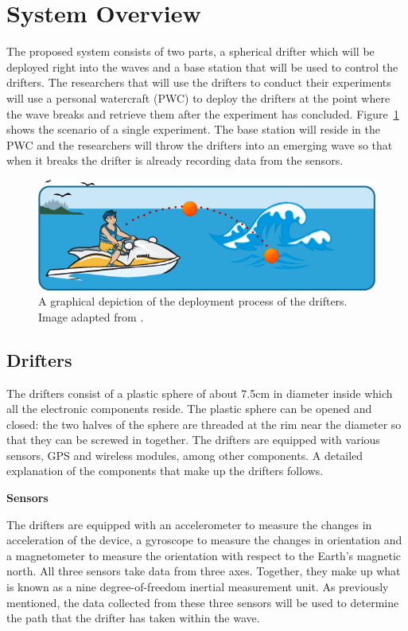\section{System Overview}
The proposed system consists of two parts, a spherical drifter which will be deployed right into the waves and a base station that will be used to control the drifters.  The researchers that will use the drifters to conduct their experiments will use a personal watercraft (PWC) to deploy the drifters at the point where the wave breaks and retrieve them after the experiment has concluded. Figure~\ref{fig:systemOverview} shows the scenario of a single experiment.  The base station will reside in the PWC and the researchers will throw the drifters into an emerging wave so that when it breaks the drifter is already recording data from the sensors.    

\begin{figure}[H]
	\centering
	\includegraphics[width=\textwidth]{img/systemOverview}
	\caption{A graphical depiction of the deployment process of the drifters. Image adapted from \cite{boaterExam}. \label{fig:systemOverview}}
\end{figure}

\subsection{Drifters}
The drifters consist of a plastic sphere of about 7.5cm in diameter inside which all the electronic components reside.  The plastic sphere can be opened and closed: the two halves of the sphere are threaded at the rim near the diameter so that they can be screwed in together. The drifters are equipped with various sensors, GPS and wireless modules, among other components.  A detailed explanation of the components that make up the drifters follows.

\noindent\textbf{Sensors}

The drifters are equipped with an accelerometer to measure the changes in acceleration of the device, a gyroscope to measure the changes in orientation and a magnetometer to measure the orientation with respect to the Earth's magnetic north.  All three sensors take data from three axes.  Together, they make up what is known as a nine degree-of-freedom inertial measurement unit.  As previously mentioned, the data collected from these three sensors will be used to determine the path that the drifter has taken within the wave.

